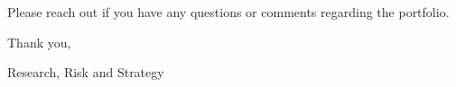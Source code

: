 \documentclass[11pt,pressrelease]{newlfm} %
\begin{document}
\begin{newlfm}
\begin{singlespace}
\begin{enumerate}
\begin{center}
\end{center}

\end{enumerate}
Please reach out if you have any questions or comments regarding the portfolio. 

Thank you, \par

Research, Risk and Strategy


\end{singlespace} %



\end{newlfm}
\end{document}
